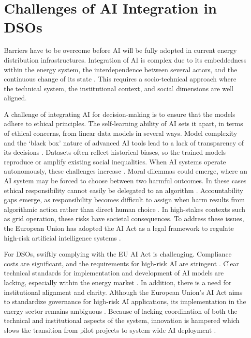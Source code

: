 \section{Challenges of AI Integration in DSOs}

Barriers have to be overcome before AI will be fully adopted in current energy distribution infrastructures. Integration of AI is complex due to its embeddedness within the energy system, the interdependence between several actors, and the continuous change of its state \autocite{Henao2025, Monaco2024}. This requires a socio-technical approach where the technical system, the institutional context, and social dimensions are well aligned.

A challenge of integrating AI for decision-making is to ensure that the models adhere to ethical principles. The self-learning ability of AI sets it apart, in terms of ethical concerns, from linear data models in several ways. Model complexity and the `black box' nature of advanced AI tools lead to a lack of transparency of its decisions \autocite{Shadi2025}. Datasets often reflect historical biases, so the trained models reproduce or amplify existing social inequalities. When AI systems operate autonomously, these challenges increase \autocite{Voyez2025}. Moral dilemmas could emerge, where an AI system may be forced to choose between two harmful outcomes. In these cases ethical responsibility cannot easily be delegated to an algorithm \autocite{Siebert2022}. Accountability gaps emerge, as responsibility becomes difficult to assign when harm results from algorithmic action rather than direct human choice \autocite{Farokhi2020, Siebert2022}. In high-stakes contexts such as grid operation, these risks have societal consequences. To address these issues, the European Union has adopted the AI Act as a legal framework to regulate high-risk artificial intelligence systems \autocite{Article71EU}.

For DSOs, swiftly complying with the EU AI Act is challenging. Compliance costs are significant, and the requirements for high-risk AI are stringent \autocite{Heymann2023}. Clear technical standards for implementation and development of AI models are lacking, especially within the energy market \autocite{Jorgensen2025}. In addition, there is a need for institutional alignment and clarity. Although the European Union's AI Act aims to standardize governance for high-risk AI applications, its implementation in the energy sector remains ambiguous \autocite{Heymann2023, Jorgensen2025}. Because of lacking coordination of both the technical and institutional aspects of the system, innovation is hampered which slows the transition from pilot projects to system-wide AI deployment \autocite{Monaco2024}.

